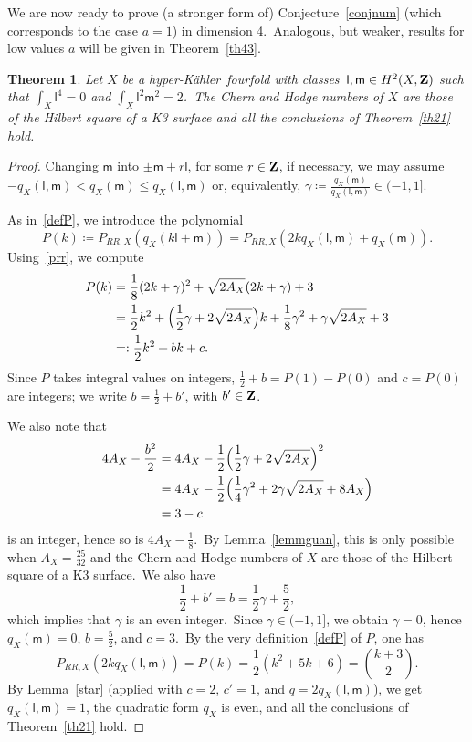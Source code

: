 \documentclass[12pt]{amsart}
\def\Z{{\bf Z}}
\def\hk{hyper-K\"ahler}
\newtheorem{theo}[lemm]{Theorem}
\theoremstyle{remark}
\def\lll{\ensuremath{\mathsf l}}
\def\mm{\ensuremath{\mathsf m}}
\begin{document}
We are now ready to prove (a stronger form of) Conjecture~\ref{conjnum} (which corresponds to the case $a=1$) in dimension 4.\ Analogous, but weaker,  results for low values $a$ will be given in Theorem~\ref{th43}.

\begin{theo}\label{th43a}
Let $X$ be a  \hk\ fourfold with classes~$\lll,\mm\in H^2(X,\Z)$ such that $\int_X \lll^{4}=0$
and   $\int_X \lll^{2}\mm^{2}=2$.\
 The Chern and Hodge numbers of $X$ are those of the Hilbert square of a K3 surface  and all the  conclusions of Theorem~\ref{th21} hold.
\end{theo}

\begin{proof}
Changing   $\mm$ into $\pm\mm+r\lll$, for some $r\in\Z$, if necessary, we may assume $-q_X(\lll,\mm)< q_X(\mm)\le q_X(\lll,\mm)$ or, equivalently, $\gamma\coloneqq \frac{q_X(\mm)}{q_X(\lll,\mm)}\in (-1,1] $.\

As in~\eqref{defP}, we introduce the polynomial
$$P(k)\coloneqq P_{RR,X}(q_X(k\lll+ \mm))=P_{RR,X}(2kq_X(\lll,\mm)+q_X(\mm)).$$
Using~\eqref{prr}, we compute
\begin{align*}
 P(k)&= \frac{1}{8}(2k+\gamma)^2+ \sqrt{2A_X}(2k+\gamma) +3  \\
 &=\frac{1}{2}k^2+\Bigl( \frac{1}{2}\gamma+2\sqrt{2A_X} \Bigr)k+\frac{1}{8}\gamma^2+ \gamma\sqrt{2A_X}+3\\
 &=:\frac{1}{2}k^2 +  b  k +c.
\end{align*}
Since $P$ takes integral values on integers, $\frac{1}2+b=P(1)-P(0)$ and $c=P(0)$ are integers; we write $b=\frac12+b'$, with $b'\in\Z$.

We also note that
\begin{align*}
    4A_X-\frac{b^2}{2}&= 4A_X-\frac{1}{2}\Bigl( \frac{1}{2}\gamma+2\sqrt{2A_X} \Bigr)^2\nonumber\\
    &=4A_X-\frac{1}{2}\Bigl( \frac{1}{4}\gamma^2+2\gamma\sqrt{2A_X}+8A_X \Bigr)\\
    &=3-c\nonumber
\end{align*}
is an integer, hence so is $4A_X-\frac{1}{8}$.\ By Lemma~\ref{lemmguan}, this is only possible when $A_X=\frac{25}{32}$ and the Chern and Hodge numbers of $X$ are those of the Hilbert square of a K3 surface.\ We also have
$$\frac12+b'=b=\frac{1}{2}\gamma+\frac52,$$
which implies that $\gamma$ is an even integer.\ Since $\gamma \in (-1,1] $, we obtain $\gamma=0$,  hence $q_X(\mm)=0$, $b=\frac52$, and $c=3$.\ By  the very definition~\eqref{defP} of $P$, one has
\[
P_{RR,X}(2kq_X(\lll,\mm))=P(k)= \frac{1}{2}(k^2 +  5  k +6)=\binom{k+3}{2}.
\]
By Lemma~\ref{star} (applied with $c=2$, $c'=1$, and $q=2q_X(\lll,\mm)$), we get $q_X(\lll,\mm)=1$, the quadratic form $q_X$ is even, and all the conclusions of Theorem~\ref{th21} hold.
\end{proof}
\end{document}

